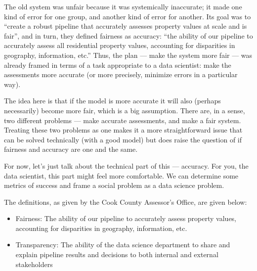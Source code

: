 \documentclass[
  letterpaper,
  DIV=11,
  numbers=noendperiod]{scrreprt}
\providecommand{\tightlist}{%
  \setlength{\itemsep}{0pt}\setlength{\parskip}{0pt}}\usepackage{longtable,booktabs,array}
\begin{document}
The old system was unfair because it was systemically inaccurate; it
made one kind of error for one group, and another kind of error for
another. Its goal was to ``create a robust pipeline that accurately
assesses property values at scale and is fair'', and in turn, they
defined fairness as accuracy: ``the ability of our pipeline to
accurately assess all residential property values, accounting for
disparities in geography, information, etc.'' Thus, the plan --- make
the system more fair --- was already framed in terms of a task
appropriate to a data scientist: make the assessments more accurate (or
more precisely, minimize errors in a particular way).

The idea here is that if the model is more accurate it will also
(perhaps necessarily) become more fair, which is a big assumption. There
are, in a sense, two different problems --- make accurate assessments,
and make a fair system. Treating these two problems as one makes it a
more straightforward issue that can be solved technically (with a good
model) but does raise the question of if fairness and accuracy are one
and the same.

For now, let's just talk about the technical part of this --- accuracy.
For you, the data scientist, this part might feel more comfortable. We
can determine some metrics of success and frame a social problem as a
data science problem.

\begin{tcolorbox}[enhanced jigsaw, arc=.35mm, colbacktitle=quarto-callout-tip-color!10!white, coltitle=black, bottomrule=.15mm, leftrule=.75mm, bottomtitle=1mm, colback=white, toptitle=1mm, breakable, titlerule=0mm, rightrule=.15mm, colframe=quarto-callout-tip-color-frame, opacitybacktitle=0.6, left=2mm, title=\textcolor{quarto-callout-tip-color}{\faLightbulb}\hspace{0.5em}{Definitions: Fairness and Transparency}, toprule=.15mm, opacityback=0]

The definitions, as given by the Cook County Assessor's Office, are
given below:

\begin{itemize}
\tightlist
\item
  Fairness: The ability of our pipeline to accurately assess property
  values, accounting for disparities in geography, information, etc.
\item
  Transparency: The ability of the data science department to share and
  explain pipeline results and decisions to both internal and external
  stakeholders
\end{itemize}

\end{tcolorbox}
\end{document}
